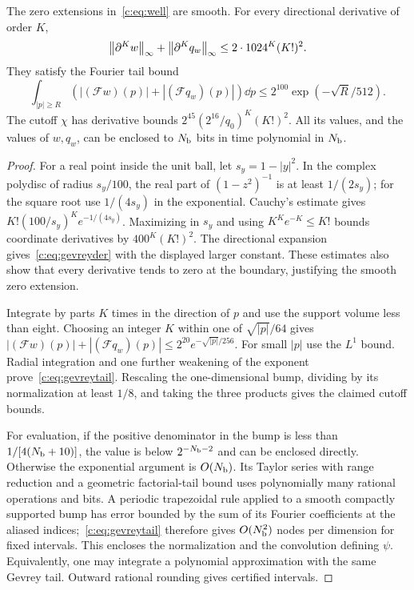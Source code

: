 \begin{lemma}
\label{c:lem:gevrey}
The zero extensions in~\eqref{c:eq:well} are smooth. For every directional
derivative of order $K$,
\begin{equation}
 \left\lVert \partial^K w\right\rVert_\infty+\left\lVert \partial^K q_w\right\rVert_\infty
 \le2\cdot1024^K(K!)^2.                              \label{c:eq:gevreyder}
\end{equation}
They satisfy the Fourier tail bound
\begin{equation}
 \int_{|p|\ge R}(|(\mathcal Fw)(p)|+|(\mathcal Fq_w)(p)|)\dd p
 \le2^{100}\exp(-\sqrt R/512).                       \label{c:eq:gevreytail}
\end{equation}
The cutoff $\chi$ has derivative bounds
$2^{45}(2^{16}/q_0)^K(K!)^2$. All its values, and the values of $w,q_w$,
can be enclosed to $N_{\rm b}$ bits in time polynomial in $N_{\rm b}$.
\end{lemma}
\begin{proof}
For a real point inside the unit ball, let $s_y=1-|y|^2$.
In the complex polydisc of radius $s_y/100$, the real part of
$(1-z^2)^{-1}$ is at least $1/(2s_y)$; for the square root use
$1/(4s_y)$ in the exponential. Cauchy's estimate gives
$K!(100/s_y)^K e^{-1/(4s_y)}$. Maximizing in $s_y$ and using
$K^K e^{-K}\le K!$ bounds coordinate derivatives by
$400^K(K!)^2$. The directional expansion gives~\eqref{c:eq:gevreyder}
with the displayed larger constant. These estimates also show that every
derivative tends to zero at the boundary, justifying the smooth zero
extension.

Integrate by parts $K$ times in the direction of $p$ and use the
support volume less than eight. Choosing an integer
$K$ within one of $\sqrt{|p|}/64$ gives
$|(\mathcal Fw)(p)|+|(\mathcal Fq_w)(p)|\le
2^{20}e^{-\sqrt{|p|}/256}$. For small $|p|$ use the $L^1$
bound. Radial integration and one further weakening of the exponent
prove~\eqref{c:eq:gevreytail}. Rescaling the one-dimensional bump,
dividing by its normalization at least $1/8$, and taking the three
products gives the claimed cutoff bounds.

For evaluation, if the positive denominator in the bump is less than
$1/[4(N_{\rm b}+10)]$, the value is below $2^{-N_{\rm b}-2}$ and can be enclosed directly.
Otherwise the exponential argument is $O(N_{\rm b})$. Its Taylor series with
range reduction and a geometric factorial-tail bound uses polynomially
many rational operations and bits. A periodic trapezoidal rule applied
to a smooth compactly supported bump has error bounded by the sum of its
Fourier coefficients at the aliased indices;~\eqref{c:eq:gevreytail}
therefore gives $O(N_{\rm b}^2)$ nodes per dimension for fixed intervals.
This encloses the normalization and the convolution defining $\psi$.
Equivalently, one may integrate a polynomial approximation with the same
Gevrey tail. Outward rational rounding gives certified intervals.
\end{proof}

